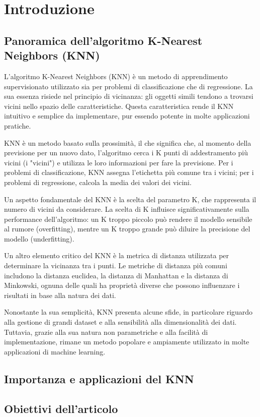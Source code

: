 
\section{Introduzione}

\subsection{Panoramica dell'algoritmo K-Nearest Neighbors (KNN)}
L'algoritmo K-Nearest Neighbors (KNN) è un metodo di apprendimento supervisionato utilizzato sia per problemi di classificazione che di regressione. La sua essenza risiede nel principio di vicinanza: gli oggetti simili tendono a trovarsi vicini nello spazio delle caratteristiche. Questa caratteristica rende il KNN intuitivo e semplice da implementare, pur essendo potente in molte applicazioni pratiche.

KNN è un metodo basato sulla prossimità, il che significa che, al momento della previsione per un nuovo dato, l'algoritmo cerca i K punti di addestramento più vicini (i "vicini") e utilizza le loro informazioni per fare la previsione. Per i problemi di classificazione, KNN assegna l'etichetta più comune tra i vicini; per i problemi di regressione, calcola la media dei valori dei vicini.

Un aspetto fondamentale del KNN è la scelta del parametro K, che rappresenta il numero di vicini da considerare. La scelta di K influisce significativamente sulla performance dell'algoritmo: un K troppo piccolo può rendere il modello sensibile al rumore (overfitting), mentre un K troppo grande può diluire la precisione del modello (underfitting).

Un altro elemento critico del KNN è la metrica di distanza utilizzata per determinare la vicinanza tra i punti. Le metriche di distanza più comuni includono la distanza euclidea, la distanza di Manhattan e la distanza di Minkowski, ognuna delle quali ha proprietà diverse che possono influenzare i risultati in base alla natura dei dati.

Nonostante la sua semplicità, KNN presenta alcune sfide, in particolare riguardo alla gestione di grandi dataset e alla sensibilità alla dimensionalità dei dati. Tuttavia, grazie alla sua natura non parametriche e alla facilità di implementazione, rimane un metodo popolare e ampiamente utilizzato in molte applicazioni di machine learning.

\subsection{Importanza e applicazioni del KNN}
\subsection{Obiettivi dell'articolo}